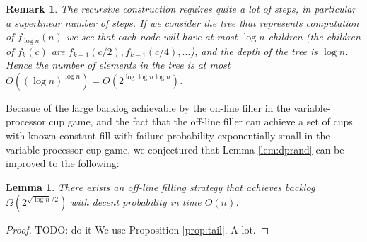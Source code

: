 \documentclass{article}[11pt]
\newtheorem{remark}{Remark}
\newtheorem{lemma}{Lemma}
\begin{document}
\begin{remark}
  The recursive construction requires quite a lot of steps, in particular a
  superlinear number of steps. If we consider the tree that represents
  computation of $f_{\log n}(n)$ we see that each node will have at most $\log n$
  children (the children of $f_k(c)$ are $f_{k-1}(c/2), f_{k-1}(c/4), \ldots$),
  and the depth of the tree is $\log n$. Hence the number of elements in the
  tree is at most $O((\log n)^{\log n}) = O(2^{\log \log n \log n})$.
\end{remark}


Becasue of the large backlog achievable by the on-line filler in the
variable-processor cup game, and the fact that the off-line filler can 
achieve a set of cups with known constant fill with failure probability
exponentially small in the variable-processor cup game, we conjectured that 
Lemma \ref{lem:dprand} can be improved to the following:
\begin{lemma}
  There exists an off-line filling strategy that achieves backlog
  $\Omega(2^{\sqrt{\log n}/2})$ with decent probability in time $O(n)$.
\end{lemma}
\begin{proof}
  {\color{red} TODO: do it}
  We use Proposition \ref{prop:tail}. A lot.
  
\end{proof}
\end{document}
